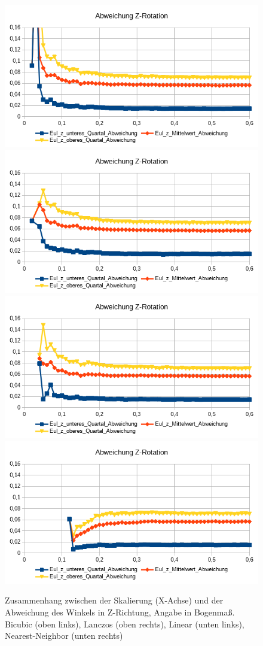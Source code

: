 \begin{figure}
	\centering
	\includegraphics[width=0.45\linewidth]{tabelle2/Z_Rot_Cubic}
	\includegraphics[width=0.45\linewidth]{tabelle2/Z_Rot_Lanc}
	\includegraphics[width=0.45\linewidth]{tabelle2/Z_Rot_Linear}
	\includegraphics[width=0.45\linewidth]{tabelle2/Z_Rot_NN}
	\caption{Zusammenhang zwischen der Skalierung (X-Achse) und der Abweichung des Winkels in Z-Richtung, Angabe in Bogenmaß.
		Bicubic (oben links), Lanczos (oben rechts), Linear (unten links), Nearest-Neighbor (unten rechts)}
	\label{img_Z_Rot_Skal}
\end{figure}
